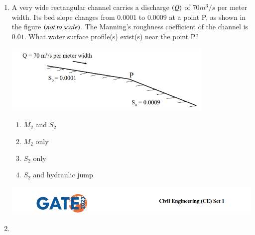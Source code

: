 \documentclass{exam}
\begin{document}
\begin{enumerate}
\item A very wide rectangular channel carries a discharge $\left(Q\right)$ of $70 m^3/s$ per meter width. Its bed slope changes from $0.0001$ to $0.0009$ at a point P, as shown in the figure $\left(\textit{not to scale}\right)$. The Manning’s roughness coefficient of the channel is $0.01$. What water surface profile(s) exist(s) near the point P?
\begin{center}
    \includegraphics[width=10cm]{pics/Screenshot 2025-08-06 124032.png}

\end{center}
\begin{enumerate}
    \item $M_2$ and $S_2$
    \item $M_2$ only
    \item $S_2$ only
    \item $S_2$ and hydraulic jump
\end{enumerate}

\newpage

\includegraphics[width=\textwidth]{pics/header.png}
\item 
\end{enumerate}
\end{document}
